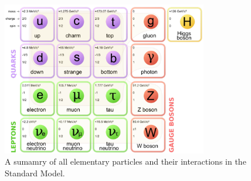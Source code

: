 \begin{figure}[hbtp]
 \begin{center}
   \includegraphics[width=0.8\textwidth]{ch2_figs/sm_particles_periodic_table.pdf}
   \caption{A sumamry of all elementary particles and their interactions in the Standard Model.}
   \label{fig:sm_periodic_table}
 \end{center}
\end{figure}

